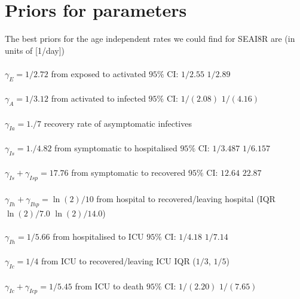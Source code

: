 \documentclass[10pt]{article}
\begin{document}
\section{Priors for parameters}
The best priors for the age independent rates we could find for SEAI8R are (in units of [1/day])\\
\\
$\gamma_{E}=1/2.72$   from exposed to activated $95\%$ CI:  $1/2.55$ $1/2.89$\\
\\
$\gamma_{A}= 1/3.12$   from activated to infected $95\%$ CI: $1/(2.08)$ $1/(4.16)$\\
\\
$\gamma_{Ia}= 1./7$           recovery rate of asymptomatic infectives\\
\\
$\gamma_{Is}   = 1./4.82$  from symptomatic to hospitalised $95\%$ CI: $1/3.487$  $1/6.157$\\
\\
$\gamma_{Is}+\gamma_{Isp}=17.76$ from symptomatic to recovered $95\%$ CI: $12.64$ $22.87$\\
\\
$\gamma_{Ih}+\gamma_{Ihp}= \ln(2)/10$ from hospital to recovered/leaving hospital (IQR $\ln(2)/7.0$ $\ln(2)/14.0$)\\
\\
$\gamma_{Ih} = 1/5.66$  from hospitalised to ICU $95\%$ CI: $1/4.18$ $1/7.14$\\
\\
$\gamma_{Ic} = 1/4  $ from ICU to recovered/leaving ICU IQR ($1/3$, $1/5$)\\
\\
$\gamma_{Ic} +\gamma_{Icp}  = 1/5.45$  from ICU to death $95\%$  CI:  $1/(2.20)$ $1/(7.65)$\\
\end{document}
